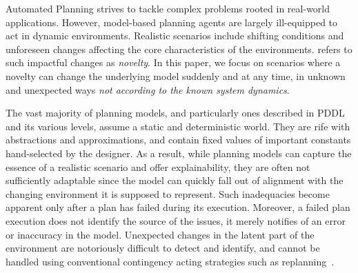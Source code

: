 \documentclass[letterpaper]{article} %
\begin{document}


Automated Planning strives to tackle complex problems rooted in real-world applications. However, model-based planning agents are largely ill-equipped to act in dynamic environments. Realistic scenarios include shifting conditions and unforeseen changes affecting the core characteristics of the environments. \citet{langley2020open} refers to such impactful changes as \emph{novelty}. In this paper, we focus on scenarios where a novelty can change the underlying model suddenly and at any time, in unknown and unexpected ways \emph{not according to the known system dynamics}.

The vast majority of planning models, and particularly ones described in PDDL~\cite{mcdermott1998pddl} and its various levels, assume a static and deterministic world. They are rife with abstractions and approximations, and contain fixed values of important constants hand-selected by the designer. As a result, while planning models can capture the essence of a realistic scenario and offer explainability, they are often not sufficiently adaptable since the model can quickly fall out of alignment with the changing environment it is supposed to represent. Such inadequacies become apparent only after a plan has failed during its execution. Moreover, a failed plan execution does not identify the source of the issues, it merely notifies of an error or inaccuracy in the model. Unexpected changes in the latent part of the environment are notoriously difficult to detect and identify, and cannot be handled using conventional contingency acting strategies such as replanning~\cite{nebel1995plan}.
\end{document}
